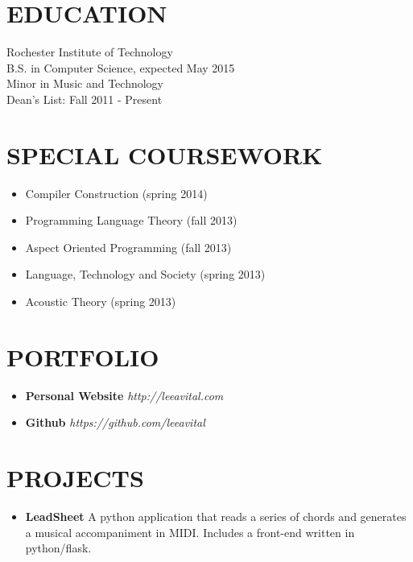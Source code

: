 \documentclass[line,margin]{res}
\begin{document}
\address{(646) 320-9143\\leeavital@gmail.com}


\begin{resume}

\section{EDUCATION}   Rochester Institute of Technology \\
                      B.S. in  Computer Science,  expected May 2015 \\
	                    Minor in Music and Technology\\
	                    Dean's List: Fall 2011 - Present


\section{SPECIAL COURSEWORK}
\begin{itemize}
   \item Compiler Construction (spring 2014)
   \item Programming Language Theory (fall 2013)
   \item Aspect Oriented Programming (fall 2013)
   \item Language, Technology and Society (spring 2013)
   \item Acoustic Theory (spring 2013)
\end{itemize}


\section{PORTFOLIO}

\begin{itemize}
   \item {\bf Personal Website}  {\sl http://leeavital.com}
   \item {\bf Github}	{\sl  https://github.com/leeavital }
\end{itemize}



\section{PROJECTS}

\begin{itemize}


\item {\bf LeadSheet} A python application that reads a series of chords and
   generates a musical accompaniment in MIDI. Includes a front-end written in
   python/flask.


\end{itemize}
\end{resume}
\end{document}

